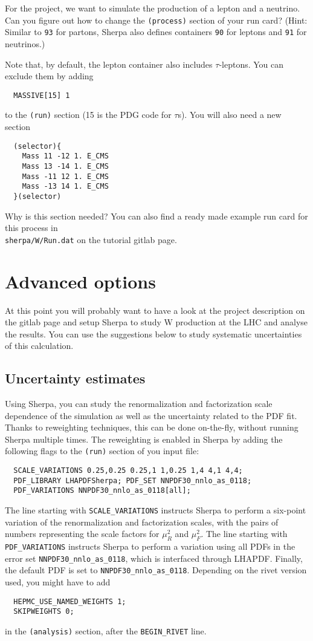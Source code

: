 \documentclass[10pt]{article}
\begin{document}
For the project, we want to simulate the production of a lepton and a
neutrino. Can you figure out how to change the {\tt (process)} section of your
run card? (Hint: Similar to {\tt 93} for partons, Sherpa also defines containers
{\tt 90} for leptons and {\tt 91} for neutrinos.)

Note that, by default, the lepton container also includes $\tau$-leptons. You
can exclude them by adding
%
\begin{verbatim}
  MASSIVE[15] 1
\end{verbatim}
%
to the {\tt (run)} section (15 is the PDG code for $\tau$s). You will also need
a new section
%
\begin{verbatim}
  (selector){
    Mass 11 -12 1. E_CMS
    Mass 13 -14 1. E_CMS
    Mass -11 12 1. E_CMS
    Mass -13 14 1. E_CMS
  }(selector)
\end{verbatim}
%
Why is this section needed? You can also find a ready made example run card for this process in\\
\texttt{sherpa/W/Run.dat} on the tutorial gitlab page.

\section{Advanced options}

At this point you will probably want to have a look at the project description
on the gitlab page and setup Sherpa to study W production at the LHC and analyse
the results. You can use the suggestions below to study systematic uncertainties
of this calculation.

\subsection{Uncertainty estimates}

Using Sherpa, you can study the renormalization and factorization
scale dependence of the simulation as well as the uncertainty
related to the PDF fit. Thanks to reweighting techniques, this can be done
on-the-fly, without running Sherpa multiple times. The reweighting is enabled in
Sherpa by adding the following flags to the {\tt (run)} section of you input file:
\begin{verbatim}
  SCALE_VARIATIONS 0.25,0.25 0.25,1 1,0.25 1,4 4,1 4,4;
  PDF_LIBRARY LHAPDFSherpa; PDF_SET NNPDF30_nnlo_as_0118;
  PDF_VARIATIONS NNPDF30_nnlo_as_0118[all];
\end{verbatim}
The line starting with {\tt SCALE\_VARIATIONS} instructs Sherpa to perform a
six-point variation of the renormalization and factorization scales,
with the pairs of numbers representing the scale factors for $\mu_R^2$
and $\mu_F^2$. The line starting with {\tt PDF\_VARIATIONS} instructs Sherpa
to perform a variation using all PDFs in the error set {\tt NNPDF30\_nnlo\_as\_0118}, which
is interfaced through LHAPDF. Finally, the default PDF is set to {\tt NNPDF30\_nnlo\_as\_0118}.
Depending on the rivet version used, you might have to add
\begin{verbatim}
  HEPMC_USE_NAMED_WEIGHTS 1;
  SKIPWEIGHTS 0;
\end{verbatim}
in the {\tt (analysis)} section, after the {\tt BEGIN\_RIVET} line.
\end{document}
